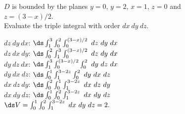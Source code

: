 {\label{13_06_ex_08}$D$ is bounded by the planes $y=0$, $y=2$,  $x=1$, $z=0$ and\\
 $z=(3-x)/2$.\\

Evaluate the triple integral with order $dx\ dy\ dz$.

}
{	$dz\ dy\ dx$: $\ds\int_1^3\int_0^{2}\int_0^{(3-x)/2}\ dz\ dy\ dx$\\
	$dz\ dx\ dy$: $\ds\int_0^2\int_1^{3}\int_0^{(3-x)/2}\ dz\ dy\ dx$\\
	$dy\ dz\ dx$: $\ds\int_1^3\int_0^{(3-x)/2}\int_0^{2}\ dy\ dz\ dx$\\
	$dy\ dx\ dz$: $\ds\int_0^1\int_1^{3-2z}\int_0^{2}\ dy\ dx\ dz$\\
	$dx\ dz\ dy$: $\ds\int_0^2\int_0^{1}\int_1^{3-2z}\ dx\ dz\ dy$\\
	$dx\ dy\ dz$: $\ds\int_0^1\int_0^{2}\int_1^{3-2z}\ dx\ dy\ dz$\\
	
	$\ds V = \int_0^1\int_0^{2}\int_1^{3-2z}\ dx\ dy\ dz =2.$
}
